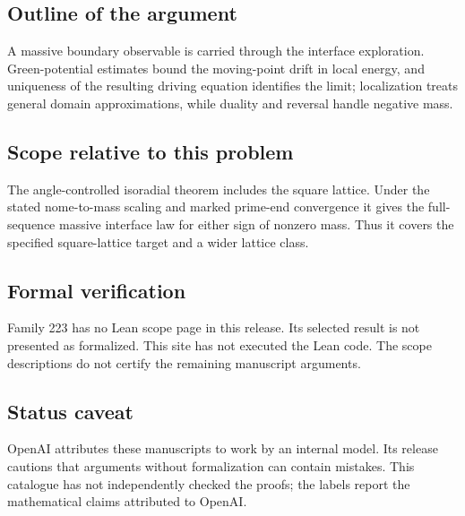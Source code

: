 \documentclass[11pt]{article}
\begin{document}
\subsection{Outline of the argument}
A massive boundary observable is carried through the interface exploration. Green-potential estimates bound the moving-point drift in local energy, and uniqueness of the resulting driving equation identifies the limit; localization treats general domain approximations, while duality and reversal handle negative mass.

\subsection{Scope relative to this problem}
The angle-controlled isoradial theorem includes the square lattice. Under the stated nome-to-mass scaling and marked prime-end convergence it gives the full-sequence massive interface law for either sign of nonzero mass. Thus it covers the specified square-lattice target and a wider lattice class.

\subsection{Formal verification}
Family 223 has no Lean scope page in this release. Its selected result is not presented as formalized. This site has not executed the Lean code. The scope descriptions do not certify the remaining manuscript arguments.

\subsection{Status caveat}
OpenAI attributes these manuscripts to work by an internal model. Its release cautions that arguments without formalization can contain mistakes. This catalogue has not independently checked the proofs; the labels report the mathematical claims attributed to OpenAI.
\end{document}
